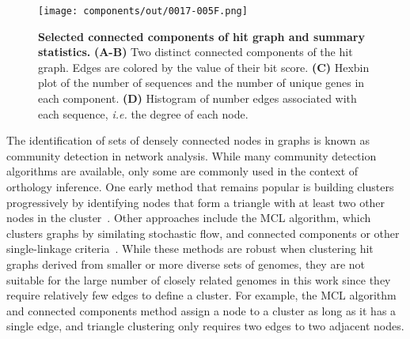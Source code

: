 \begin{figure}[h!]
\texttt{[image: components/out/0017-005F.png]}
\centering
\caption{\textbf{Selected connected components of hit graph and summary statistics.}
\textbf{(A-B)} Two distinct connected components of the hit graph. Edges are colored by the value of their bit score. \textbf{(C)} Hexbin plot of the number of sequences and the number of unique genes in each component. \textbf{(D)} Histogram of number edges associated with each sequence, \textit{i.e.} the degree of each node.}
\label{fig:components}
\end{figure}

The identification of sets of densely connected nodes in graphs is known as community detection in network analysis. While many community detection algorithms are available, only some are commonly used in the context of orthology inference. One early method that remains popular is building clusters progressively by identifying nodes that form a triangle with at least two other nodes in the cluster~\cite{Tatusov1997, Jensen2007}. Other approaches include the MCL algorithm, which clusters graphs by similating stochastic flow, and connected components or other single-linkage criteria~\cite{Remm2001, Enright2002, Li2003, Emms2015, Train2017, Cosentino2018}. While these methods are robust when clustering hit graphs derived from smaller or more diverse sets of genomes, they are not suitable for the large number of closely related genomes in this work since they require relatively few edges to define a cluster. For example, the MCL algorithm and connected components method assign a node to a cluster as long as it has a single edge, and triangle clustering only requires two edges to two adjacent nodes.

